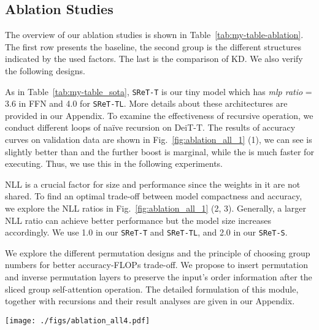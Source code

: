 \documentclass[runningheads]{llncs}
\begin{document}
	\subsection{Ablation Studies} \label{ablation_study}
	
	The overview of our ablation studies is shown in Table~\ref{tab:my-table-ablation}. The first row presents the baseline, the second group is the different structures indicated by the used factors. The last is the comparison of KD. We also verify the following designs.
	
	 As in Table~\ref{tab:my-table_sota}, \texttt{SReT-T} is our tiny model which has {\em mlp ratio} = 3.6 in FFN and 4.0 for \texttt{SReT-TL}. More details about these architectures are provided in our Appendix. To examine the effectiveness of recursive operation, we conduct different loops of na\"ive recursion on DeiT-T. The results of accuracy curves on validation data are shown in Fig.~\ref{fig:ablation_all_1} (1), we can see  is slightly better than  and the further boost is marginal, while the  is much faster for executing. Thus, we use this in the following experiments.
	
	 NLL is a crucial factor for size and performance since the weights in it are not shared. To find an optimal trade-off between model compactness and accuracy, we explore the NLL ratios in Fig.~\ref{fig:ablation_all_1} (2, 3). Generally, a larger NLL ratio can achieve better performance but the model size increases accordingly. We use 1.0 in our \texttt{SReT-T} and \texttt{SReT-TL}, and 2.0 in our \texttt{SReT-S}.
	
	 We explore the different permutation designs and the principle of choosing group numbers for better accuracy-FLOPs trade-off. We propose to insert permutation and inverse permutation layers to preserve the input's order information after the sliced group self-attention operation. The detailed formulation of this module, together with recursions and their result analyses are given in our Appendix.
	
	\begin{figure*}[b]
		\centering \vspace{-0.2in}
		\texttt{[image: ./figs/ablation\_all4.pdf]}\vspace{-0.1in}
		\caption{A comprehensive ablation study on different design factors.}
		\label{fig:ablation_all_1}
	\end{figure*}
	
\end{document}
